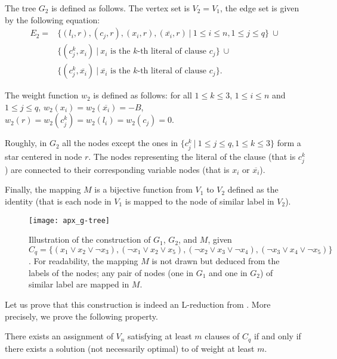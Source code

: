 		The tree $G_2$ is defined as follows. The vertex set is $V_2=V_1$, the edge set is given by the following equation:
		\begin{align*}
		E_2= & \{(l_i,r), (c_j,r), (x_i,r), (\overline{x_i},r) ~\vert~ 1\leq i\leq n, 1\leq j \leq q\} ~\cup \\
		& \{(c^k_j,x_i) ~\vert~ x_i \text{ is the  } k\text{-th literal of clause } c_j\} ~\cup\\
		& \{(c^k_j,\overline{x_i}) ~\vert~ \overline{x_i} \text{ is the } k\text{-th literal of clause } c_j\}.
		\end{align*}

		The weight function $w_2$ is defined as follows: for all $1\leq k \leq 3$, $1\leq i\leq n$ and $1\leq j \leq q$, $w_2(x_i)=w_2(\overline{x_i})=-B$, $w_2(r)=w_2(c_j^k)=w_2(l_i)=w_2(c_j)=0$.


		Roughly, in $G_2$ all the nodes except the ones in $\{c_j^k~\vert~ 1\leq j \leq q, 1\leq k\leq 3\}$ form a star centered in node $r$. The nodes representing the literal of the clause (that is $c_j^k$) are connected to their corresponding variable nodes (that is $x_i$ or $\overline{x_i}$).

		Finally, the mapping $M$ is a bijective function from $V_1$ to $V_2$ defined as the identity (that is each node in $V_1$ is mapped to the node of similar label in $V_2$).


		\begin{figure}[ht]
    	 	 
    	 	 \centering
    	 	 \texttt{[image: apx\_g-tree]}
    	 	 \caption[Illustration of the construction of $G_1$, $G_2$, and $M$, given $C_q$ (2)]{Illustration of the construction of $G_1$, $G_2$, and $M$, given $C_q = \{(x_1 \vee x_2 \vee \neg{}x_3), (\neg{}x_1 \vee x_2 \vee x_5), (\neg{}x_2 \vee x_3 \vee \neg{}x_4), (\neg{}x_3 \vee x_4 \vee \neg{}x_5)\}$. For readability, the mapping $M$ is not drawn but deduced from the labels of the nodes; any pair of nodes (one in $G_1$ and one in $G_2$) of similar label are mapped in $M$.}\label{fig:g-tree}
    	 	 \end{figure}
   		
		Let us prove that this construction is indeed an L-reduction from \msat{}. More precisely, we prove the following property.

		\begin{lemma}
 	 	 There exists an assignment of $V_n$ satisfying at least $m$ clauses of $C_q$ if and only if there exists a solution (not necessarily optimal) to \mwccs{} of weight at least $m$.
		\end{lemma}

